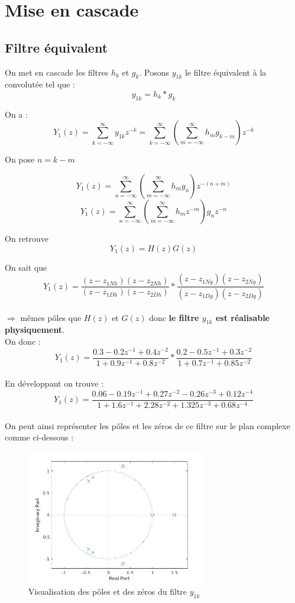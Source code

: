 \documentclass[12,french]{report}
\begin{document}
\chapter{Mise en cascade}

\section{Filtre équivalent}

On met en cascade les filtres $h_k$ et $g_k$. Posons $y_{1k}$ le filtre équivalent à la convolutée tel que : 
$$y_{1k}=h_k*g_k$$

On a :
$$ Y_1(z)=\sum_{k=-\infty}^{\infty}y_{1k}z^{-k}=\sum_{k=-\infty}^{\infty}\left(\sum_{m=-\infty}^{\infty}h_mg_{k-m}\right)z^{-k} $$

On pose $n=k-m$

$$ Y_1(z)=\sum_{n=-\infty}^{\infty}\left(\sum_{m=-\infty}^{\infty}h_mg_n\right)z^{-(n+m)} $$
$$ Y_1(z)=\sum_{n=-\infty}^{\infty}\left(\sum_{m=-\infty}^{\infty}h_mz^{-m}\right)g_nz^{-n} $$

On retrouve
$$ Y_1(z)=H(z)G(z) $$

On sait que \\
$$ Y_1(z)= \frac{(z-z_{1Nh})(z-z_{2Nh})}{(z-z_{1Dh})(z-z_{2Dh})}*\frac{(z-z_{1Ng})(z-z_{2Ng})}{(z-z_{1Dg})(z-z_{2Dg})} $$\\

$\Longrightarrow$ mêmes pôles que $H(z)$ et $G(z)$ donc \textbf{le filtre $y_{1k}$ est réalisable physiquement}.\\

On donc :
$$Y_1(z)= \frac{0.3-0.2z^{-1}+0.4z^{-2}}{1+0.9z^{-1}+0.8z^{-2}}*\frac{0.2-0.5z^{-1}+0.3z^{-2}}{1+0.7z^{-1}+0.85z^{-2}} $$\\

En développant on trouve :
$$Y_1(z)=\frac{0.06-0.19z^{-1}+0.27z^{-2}-0.26z^{-3}+0.12z^{-4}}{1+1.6z^{-1}+2.28z^{-2}+1.325z^{-3}+0.68z^{-4}} $$\\

On peut ainsi représenter les pôles et les zéros de ce filtre sur le plan complexe comme ci-dessous :

\begin{figure}[H]
	\center
	\includegraphics[width=0.7\textwidth]{./Images/zplane_Y1}
	\caption{Visualisation des pôles et des zéros du filtre $y_{1k}$}
\end{figure}\vspace{0.2cm}
\end{document}
